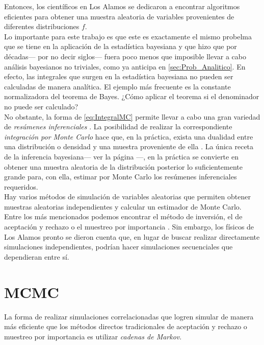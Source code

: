 Entonces, los científicos en Los Alamos se dedicaron a encontrar algoritmos eficientes para obtener una muestra aleatoria de variables provenientes de diferentes distribuciones $f$.\\ 

Lo importante para este trabajo es que este es exactamente el mismo probelma que se tiene en la aplicación de la estadística bayesiana y que hizo que por décadas--- por no decir siglos--- fuera poco menos que imposible llevar a cabo análisis bayesianos no triviales, como ya anticipa en \ref{sec:Prob_Analitico}. En efecto, las integrales que surgen en la estadística bayesiana no pueden ser calculadas de manera analítica. El ejemplo más frecuente es la constante normalizadora del teorema de Bayes. ¿Cómo aplicar el teorema si el denominador no puede ser calculado?\\ 

No obstante, la forma de \eqref{eq:IntegralMC} permite llevar a cabo una gran variedad de \textit{resúmenes inferenciales} \parencite{GP97}. La posibilidad de realizar la correspondiente \textit{integración por Monte Carlo} hace que, en la práctica, exista una dualidad entre una distribución o densidad y una muestra proveniente de ella \parencite{SmithGelfand92}. La única receta de la inferencia bayesiana--- ver la página \pageref{receta_bayesiana}---, en la práctica se convierte en obtener una muestra aleatoria de la distribución posterior lo suficientemente grande para, con ella, estimar por Monte Carlo los resúmenes inferenciales requeridos.\\

Hay varios métodos de simulación de variables aleatorias que permiten obtener muestras aleatorias independientes y calcular un estimador de Monte Carlo. Entre los más mencionados podemos encontrar el método de inversión, el de aceptación y rechazo o el muestreo por importancia \parencites{Ross13,RobertCasella10}. Sin embargo, los físicos de Los Alamos pronto se dieron cuenta que, en lugar de buscar realizar directamente simulaciones independientes, podrían hacer simulaciones secuenciales que dependieran entre sí. 

\section{MCMC}

La forma de realizar simulaciones correlacionadas que logren simular de manera más eficiente que los métodos directos tradicionales de aceptación y rechazo o muestreo por importancia es utilizar \textit{cadenas de Markov}.

